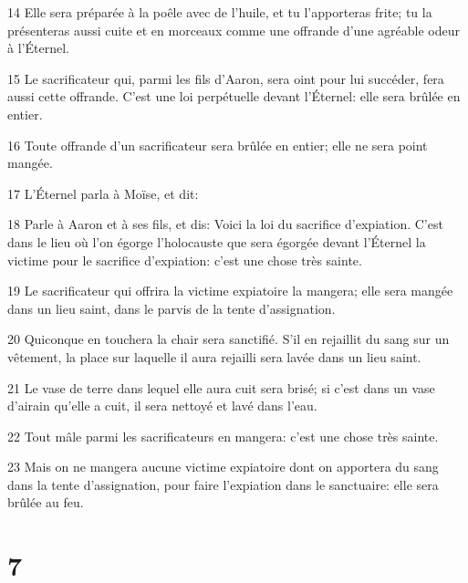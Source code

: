 \par 14 Elle sera préparée à la poêle avec de l'huile, et tu l'apporteras frite; tu la présenteras aussi cuite et en morceaux comme une offrande d'une agréable odeur à l'Éternel.
\par 15 Le sacrificateur qui, parmi les fils d'Aaron, sera oint pour lui succéder, fera aussi cette offrande. C'est une loi perpétuelle devant l'Éternel: elle sera brûlée en entier.
\par 16 Toute offrande d'un sacrificateur sera brûlée en entier; elle ne sera point mangée.
\par 17 L'Éternel parla à Moïse, et dit:
\par 18 Parle à Aaron et à ses fils, et dis: Voici la loi du sacrifice d'expiation. C'est dans le lieu où l'on égorge l'holocauste que sera égorgée devant l'Éternel la victime pour le sacrifice d'expiation: c'est une chose très sainte.
\par 19 Le sacrificateur qui offrira la victime expiatoire la mangera; elle sera mangée dans un lieu saint, dans le parvis de la tente d'assignation.
\par 20 Quiconque en touchera la chair sera sanctifié. S'il en rejaillit du sang sur un vêtement, la place sur laquelle il aura rejailli sera lavée dans un lieu saint.
\par 21 Le vase de terre dans lequel elle aura cuit sera brisé; si c'est dans un vase d'airain qu'elle a cuit, il sera nettoyé et lavé dans l'eau.
\par 22 Tout mâle parmi les sacrificateurs en mangera: c'est une chose très sainte.
\par 23 Mais on ne mangera aucune victime expiatoire dont on apportera du sang dans la tente d'assignation, pour faire l'expiation dans le sanctuaire: elle sera brûlée au feu.

\chapter{7}

